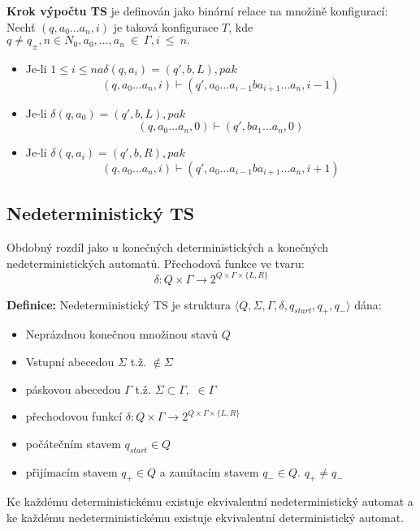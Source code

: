 \documentclass[10pt,a4paper]{article}
\begin{document}
		\textbf{Krok výpočtu TS} je definován jako binární relace na množině konfigurací: Nechť $(q,a_{0} \dots a_{n}, i) $
		je taková konfigurace $T$, kde $q \neq q_{\pm}, n \in N_{0}, a_{0}, \dots, a_{n}~\in~\Gamma, i~\leq~n. $
		\begin{itemize}
			\item Je-li $1 \leq i \leq n a \delta(q,a_{i}) = (q', b, L), pak$
				$$(q,a_{0} \dots a_{n}, i) \vdash (q', a_{0} \dots a_{i-1}ba_{i+1} \dots a_{n}, i-1) $$
			\item Je-li $\delta(q,a_{0}) = (q', b, L), pak$
				$$(q,a_{0} \dots a_{n}, 0) \vdash (q', ba_{1} \dots a_{n}, 0) $$
			\item Je-li $\delta(q,a_{i}) = (q', b, R), pak$
				$$(q,a_{0} \dots a_{n}, i) \vdash (q', a_{0} \dots a_{i-1}ba_{i+1} \dots a_{n}, i+1) $$
		\end{itemize}
	
	

	\subsection{Nedeterministický TS}

		Obdobný rozdíl jako u konečných deterministických a konečných nedeterministických automatů. Přechodová funkce ve 				tvaru:
		$$\delta : Q \times  \Gamma \rightarrow 2^{Q \times \Gamma \times \{L , R \}}$$

		\textbf{Definice: }
		Nedeterministický TS je struktura $\langle Q, \Sigma, \Gamma, \delta, q_{start}, q_{+}, q_{-} \rangle $ dána:
		\begin{itemize}
			\item Neprázdnou konečnou množinou stavů $Q$
			\item Vstupní abecedou  $\Sigma$ t.ž. \textvisiblespace $ \notin \Sigma$
			\item páskovou abecedou $\Gamma$ t.ž. $\Sigma \subset \Gamma,$ \textvisiblespace $\in  \Gamma $
			\item přechodovou funkcí $\delta : Q \times  \Gamma \rightarrow 2^{Q \times \Gamma \times \{L , R \}} $
			\item počátečním stavem $q_{start} \in Q$
			\item přijímacím stavem $q_{+} \in Q $ a zamítacím stavem $q_{-} \in Q.$ $q_{+} \neq q_{-}$
		\end{itemize}

		Ke každému deterministickému existuje ekvivalentní nedeterministický automat a ke každému 
		nedeterministickému existuje ekvivalentní deterministický automat.
\end{document}
